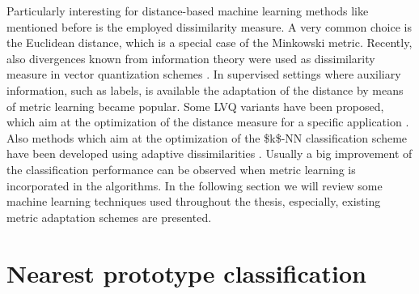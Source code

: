 Particularly interesting for distance-based machine learning methods like mentioned before is the employed dissimilarity measure. 
A very common choice is the Euclidean distance, which is a special case of the Minkowski metric. 
Recently, also divergences known from information theory were used as dissimilarity measure in 
vector quantization schemes \cite{Mwebaze2011,Villmann2011}. 
In supervised settings where auxiliary information, such as labels, is available the adaptation of the distance 
by means of metric learning became popular. 
Some \ac{LVQ} variants have been proposed, which aim at the optimization of the distance measure for a specific application 
\cite{Bojer2001,Hammer2002,Schneider2009a,Schneider2009b}. 
Also methods which aim at the optimization of the \ac{$k$-NN} classification scheme have been developed using adaptive 
dissimilarities \cite{Goldberger2004,Weinberger2006}. 
Usually a big improvement of the classification performance can be observed when metric learning is incorporated in the algorithms. 
In the following section we will review some machine learning techniques used throughout the thesis, 
especially, existing metric adaptation schemes are presented. 

\section{Nearest prototype classification}

